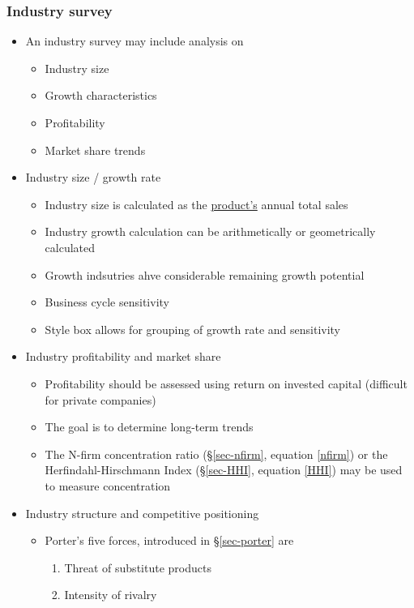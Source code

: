 \documentclass[../notes_compiled.tex]{subfiles}
\begin{document}
\subsubsection{Industry survey}
\begin{itemize}
\item An industry survey may include analysis on
\begin{multicols}{2}
\begin{itemize}
\item Industry size
\item Growth characteristics
\item Profitability
\item Market share trends
\end{itemize}
\end{multicols}
\item Industry size / growth rate
\begin{itemize}
\item Industry size is calculated as the \underline{product’s} annual total sales
\item Industry growth calculation can be arithmetically or geometrically calculated
\item Growth indsutries ahve considerable remaining growth potential
\item Business cycle sensitivity
\item Style box allows for grouping of growth rate and sensitivity
\end{itemize}
\item Industry profitability and market share
\begin{itemize}
\item Profitability should be assessed using return on invested capital (difficult for private companies)
\item The goal is to determine long-term trends
\item The N-firm concentration ratio (\S\ref{sec-nfirm}, equation \ref{nfirm}) or the Herfindahl-Hirschmann Index (\S\ref{sec-HHI}, equation \ref{HHI}) may be used to measure concentration
\end{itemize}
\item Industry structure and competitive positioning
\begin{itemize}
\item Porter’s five forces, introduced in \S\ref{sec-porter} are
\begin{enumerate}
\item Threat of substitute products
\item Intensity of rivalry

\end{enumerate}
\end{itemize}
\end{itemize}
\end{document}
